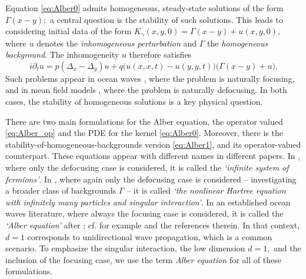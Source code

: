 \documentclass[11pt]{amsart}
\theoremstyle{definition}
\begin{document}
Equation \eqref{eq:Alber0} admits homogeneous, steady-state  solutions of the form $\Gamma(x-y);$ a central question is the stability of such solutions. This leads to considering initial data of the form $K_\gamma(x,y,0) = \Gamma(x-y) + u(x,y,0),$ where $u$ denotes the {\em inhomogeneous perturbation} and $\Gamma$ the {\em homogeneous background}. The inhomogeneity $u$ therefore satisfies
\begin{equation}\label{eq:Alber1}
  i\partial_t u = p(\Delta_x - \Delta_y)u
  + q\bigl(u(x,x,t)-u(y,y,t)\bigr)\bigl(\Gamma(x-y)+u\bigr).
\end{equation}
Such problems appear in ocean waves \cite{Alber1978}, where the problem is naturally focusing, and in mean field models  \cite{ChenHongPavlovic2017,HadamaHong2025,HadamaRout2026}, where the problem is naturally defocusing. In both cases, the stability of homogeneous solutions is a key physical question.

There are two main formulations for the Alber equation, the operator valued \eqref{eq:Alber_op} and the PDE for the kernel \eqref{eq:Alber0}. Moreover, there is the stability-of-homogeneous-backgrounds version \eqref{eq:Alber1}, and its operator-valued counterpart. These equations appear with different names in different papers. In \cite{ChenHongPavlovic2017}, where only the defocusing case is considered,  it is called the {\em `infinite system of fermions'}. In \cite{HadamaHong2025}, where again only the defocusing case is considered -- investigating a broader class of backgrounds $\Gamma$ -- it is called {\em `the nonlinear Hartree equation with infinitely many particles and singular interaction'}. In an established ocean waves literature, where always the focusing case is considered, it is called the {\em `Alber equation'} after \cite{Alber1978}; cf. for example \cite{AAPS2020,AthanassoulisKyza2024,RibalBabaninYoungToffoliStiassnie2013,StiassnieRegevAgnon2008} and the references therein. In that context, $d=1$ corresponds to unidirectional wave propagation, which is a common scenario. To emphasize the singular interaction, the low dimension $d=1,$ and the inclusion of  the focusing case, we use the term {\em Alber equation} for all of these formulations. 
\end{document}

